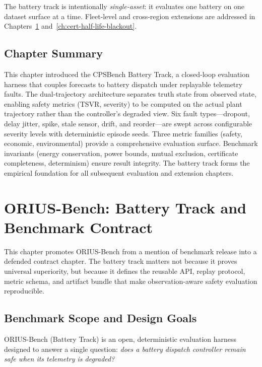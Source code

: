 The battery track is intentionally \emph{single-asset}: it evaluates one
battery on one dataset surface at a time.  Fleet-level and cross-region
extensions are addressed in Chapters~\ref{ch:orius-bench-battery}
and~\ref{ch:cert-half-life-blackout}.

\subsection{Chapter Summary}

This chapter introduced the CPSBench Battery Track, a closed-loop
evaluation harness that couples forecasts to battery dispatch under
replayable telemetry faults.  The dual-trajectory architecture separates
truth state from observed state, enabling safety metrics (TSVR, severity)
to be computed on the actual plant trajectory rather than the controller's
degraded view.  Six fault types---dropout, delay jitter, spike, stale
sensor, drift, and reorder---are swept across configurable severity levels
with deterministic episode seeds.  Three metric families (safety, economic,
environmental) provide a comprehensive evaluation surface.  Benchmark
invariants (energy conservation, power bounds, mutual exclusion, certificate
completeness, determinism) ensure result integrity.  The battery track
forms the empirical foundation for all subsequent evaluation and extension
chapters.


\section{ORIUS-Bench: Battery Track and Benchmark Contract}
\label{ch:orius-bench-battery}

This chapter promotes ORIUS-Bench from a mention of benchmark release into a
defended contract chapter.  The battery track matters not because it proves
universal superiority, but because it defines the reusable API, replay
protocol, metric schema, and artifact bundle that make observation-aware
safety evaluation reproducible.

\subsection{Benchmark Scope and Design Goals}

ORIUS-Bench (Battery Track) is an open, deterministic evaluation harness
designed to answer a single question: \emph{does a battery dispatch
controller remain safe when its telemetry is degraded?}

